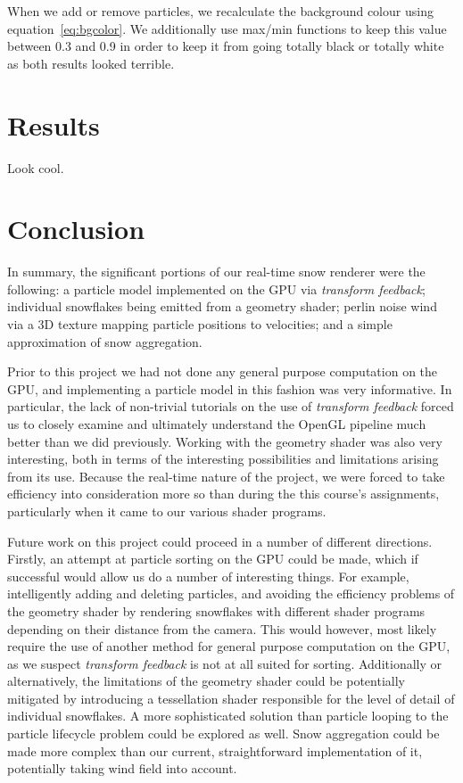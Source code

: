 \documentclass[conference]{acmsiggraph}
\begin{document}
When we add or remove particles, we recalculate the background colour using equation~\ref{eq:bgcolor}. We additionally use max/min functions to keep this value between 0.3 and 0.9 in order to keep it from going totally black or totally white as both results looked terrible.

\section{Results}
Look cool.

\section{Conclusion}
In summary, the significant portions of our real-time snow renderer were the following: a particle model implemented on the GPU via \textit{transform feedback}; individual snowflakes being emitted from a geometry shader; perlin noise wind via a 3D texture mapping particle positions to velocities; and a simple approximation of snow aggregation.

Prior to this project we had not done any general purpose computation on the GPU, and implementing a particle model in this fashion was very informative. In particular, the lack of non-trivial tutorials on the use of \textit{transform feedback} forced us to closely examine and ultimately understand the OpenGL pipeline much better than we did previously. Working with the geometry shader was also very interesting, both in terms of the interesting possibilities and limitations arising from its use. Because the real-time nature of the project, we were forced to take efficiency into consideration more so than during the this course's assignments, particularly when it came to our various shader programs.

Future work on this project could proceed in a number of different directions. Firstly, an attempt at particle sorting on the GPU could be made, which if successful would allow us do a number of interesting things. For example, intelligently adding and deleting particles, and avoiding the efficiency problems of the geometry shader by rendering snowflakes with different shader programs depending on their distance from the camera. This would however, most likely require the use of another method for general purpose computation on the GPU, as we suspect \textit{transform feedback} is not at all suited for sorting. Additionally or alternatively, the limitations of the geometry shader could be potentially mitigated by introducing a tessellation shader responsible for the level of detail of individual snowflakes. A more sophisticated solution than particle looping to the particle lifecycle problem could be explored as well. Snow aggregation could be made more complex than our current, straightforward implementation of it, potentially taking wind field into account.


\nocite{*}

\end{document}
